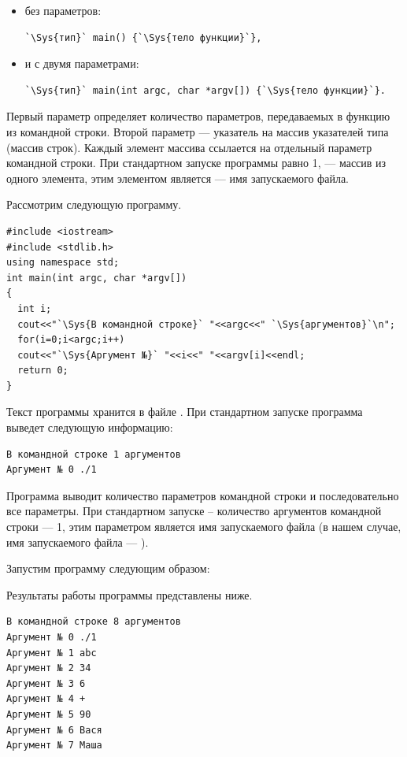 \begin{itemize}
\item без параметров:
\begin{lstlisting}
`\Sys{тип}` main() {`\Sys{тело функции}`},
\end{lstlisting}
\item и с двумя параметрами:
\begin{lstlisting}
`\Sys{тип}` main(int argc, char *argv[]) {`\Sys{тело функции}`}.
\end{lstlisting}
\end{itemize}

Первый параметр  определяет количество параметров, передаваемых в функцию  из командной
строки. Второй параметр  --- указатель на массив указателей типа
 (массив строк). Каждый элемент массива ссылается на
отдельный параметр командной строки. При стандартном запуске программы  равно 1, 
 --- массив из одного элемента,
этим элементом является --- имя запускаемого файла.

Рассмотрим следующую программу. 
\begin{lstlisting}
#include <iostream>
#include <stdlib.h>
using namespace std;
int main(int argc, char *argv[])
{
  int i;
  cout<<"`\Sys{В командной строке}` "<<argc<<" `\Sys{аргументов}`\n";
  for(i=0;i<argc;i++)
  cout<<"`\Sys{Аргумент №}` "<<i<<" "<<argv[i]<<endl;
  return 0;
}
\end{lstlisting}

Текст программы хранится в файле . При стандартном запуске программа выведет следующую
информацию:
\begin{verbatim}
В командной строке 1 аргументов
Аргумент № 0 ./1
\end{verbatim}
Программа выводит количество параметров командной строки и последовательно все параметры. При стандартном запуске –
количество аргументов командной строки --- 1, этим параметром является имя запускаемого файла (в нашем случае, имя
запускаемого файла --- ).

Запустим программу следующим образом: 


Результаты работы программы представлены ниже.
\begin{verbatim}
В командной строке 8 аргументов 
Аргумент № 0 ./1 
Аргумент № 1 abc 
Аргумент № 2 34 
Аргумент № 3 6 
Аргумент № 4 + 
Аргумент № 5 90 
Аргумент № 6 Вася 
Аргумент № 7 Маша
\end{verbatim}

